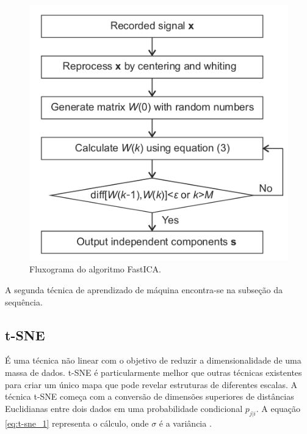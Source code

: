 \begin{figure}[H]
    \caption{Fluxograma do algoritmo FastICA.}
    \begin{center}
        \includegraphics[scale=.5]{referencial/img/fatica_fang_p3.png}
    \end{center}
    \label{fig:fatica_fang_p3}
\end{figure}

A segunda técnica de aprendizado de máquina encontra-se na subseção da sequência.


% 

\subsection{t-SNE}

É uma técnica não linear com o objetivo de reduzir a dimensionalidade de uma massa de dados. t-SNE é particularmente melhor que 
outras técnicas existentes para criar um único mapa que pode revelar estruturas de diferentes escalas. A técnica t-SNE começa com a 
conversão de dimensões superiores de distâncias Euclidianas entre dois dados em uma probabilidade condicional
$p_{j|i}$. A equação \ref{eq:t-sne_1} representa o cálculo, onde $\sigma$ é a variância \cite{VanDerMaaten2008}.

